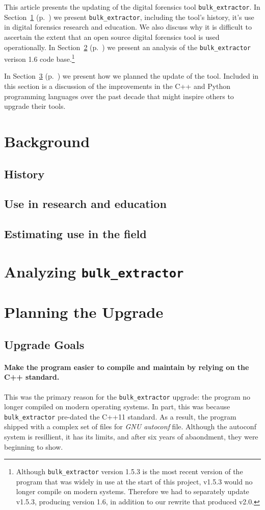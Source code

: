 \documentclass[5p]{elsarticle}
\newcommand{\be}{\texttt{bulk\_extractor}\xspace}
\newcommand{\secref}[1]{Section~\ref{#1} (p.~\pageref{#1})}
\begin{document}
This article presents the updating of the digital forensics tool \be.
In \secref{background} we present \be, including the tool's history,
it's use in digital forensics research and education. We also discuss
why it is difficult to ascertain the extent that an open source digital
forensics tool is used operationally. In \secref{analysis} we present
an analysis of the \be verison 1.6 code base.\footnote{Although \be version 1.5.3
is the most recent version of the program that was widely in use at
the start of this project, v1.5.3 would
no longer compile on modern systems. Therefore we had to separately
update v1.5.3, producing version 1.6, in addition to our rewrite that
produced v2.0.}

In \secref{improvement} we present how we planned the update of the
tool. Included in this section is a discussion of the improvements in
the C++ and Python programming languages over the past decade that
might inspire others to upgrade their tools.



\section{Background}\label{background}

\subsection{History}
\subsection{Use in research and education}
\subsection{Estimating use in the field}

\section{Analyzing \be}\label{analysis}
\section{Planning the Upgrade}\label{improvement}
\subsection{Upgrade Goals}

\paragraph{Make the program easier to compile and maintain by relying on the
C++ standard.} This was the primary reason for the \be upgrade: the
program no longer compiled on modern operating systems. In part, this
was because \be pre-dated the C++11 standard. As a result, the program
shipped with a complex set of files for \emph{GNU autoconf}
file. Although the autoconf system is resillient, it has its limits,
and after six years of abaondment, they were beginning to show.
\end{document}

